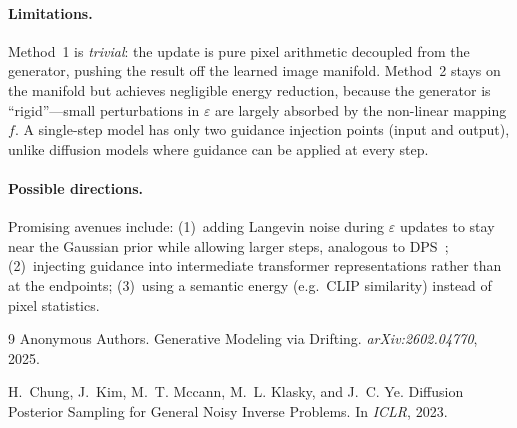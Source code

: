 \documentclass[12pt]{article}
\begin{document}
\paragraph{Limitations.}
Method~1 is \emph{trivial}: the update is pure pixel arithmetic decoupled
from the generator, pushing the result off the learned image manifold.
Method~2 stays on the manifold but achieves negligible energy reduction,
because the generator is ``rigid''---small perturbations in $\varepsilon$
are largely absorbed by the non-linear mapping $f$.
A single-step model has only two guidance injection points (input and output),
unlike diffusion models where guidance can be applied at every step.

\paragraph{Possible directions.}
Promising avenues include:
(1)~adding Langevin noise during $\varepsilon$ updates to stay near the
Gaussian prior while allowing larger steps, analogous to DPS~\cite{chung2022dps};
(2)~injecting guidance into intermediate transformer representations rather
than at the endpoints;
(3)~using a semantic energy (e.g.\ CLIP similarity) instead of pixel statistics.


\begin{thebibliography}{9}
Anonymous Authors.
\newblock Generative Modeling via Drifting.
\newblock \textit{arXiv:2602.04770}, 2025.

H.~Chung, J.~Kim, M.~T. Mccann, M.~L. Klasky, and J.~C. Ye.
\newblock Diffusion Posterior Sampling for General Noisy Inverse Problems.
\newblock In \textit{ICLR}, 2023.
\end{thebibliography}
\end{document}
